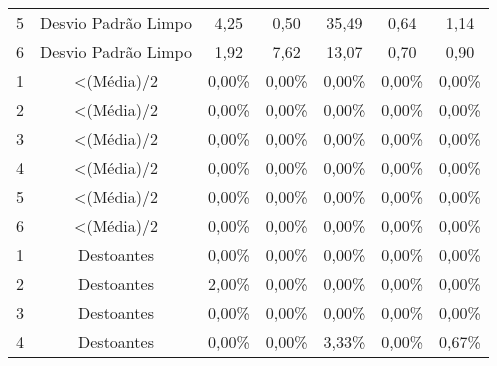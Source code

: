 \begin{table}[]
\begin{tabular}{|c|c|ccccc|}
5              & Desvio Padrão Limpo                                                        & 4,25              & 0,50              & 35,49             & 0,64              & 1,14              \\
6              & Desvio Padrão Limpo                                                        & 1,92              & 7,62              & 13,07             & 0,70              & 0,90              \\ \hline
1              & \textless (Média)/2                                                        & 0,00\%            & 0,00\%            & 0,00\%            & 0,00\%            & 0,00\%            \\
2              & \textless (Média)/2                                                        & 0,00\%            & 0,00\%            & 0,00\%            & 0,00\%            & 0,00\%            \\
3              & \textless (Média)/2                                                        & 0,00\%            & 0,00\%            & 0,00\%            & 0,00\%            & 0,00\%            \\
4              & \textless (Média)/2                                                        & 0,00\%            & 0,00\%            & 0,00\%            & 0,00\%            & 0,00\%            \\
5              & \textless (Média)/2                                                        & 0,00\%            & 0,00\%            & 0,00\%            & 0,00\%            & 0,00\%            \\
6              & \textless (Média)/2                                                        & 0,00\%            & 0,00\%            & 0,00\%            & 0,00\%            & 0,00\%            \\ \hline
1              & Destoantes                                                                 & 0,00\%            & 0,00\%            & 0,00\%            & 0,00\%            & 0,00\%            \\
2              & Destoantes                                                                 & 2,00\%            & 0,00\%            & 0,00\%            & 0,00\%            & 0,00\%            \\
3              & Destoantes                                                                 & 0,00\%            & 0,00\%            & 0,00\%            & 0,00\%            & 0,00\%            \\
4              & Destoantes                                                                 & 0,00\%            & 0,00\%            & 3,33\%            & 0,00\%            & 0,67\%            \\

\end{tabular}
\end{table}
